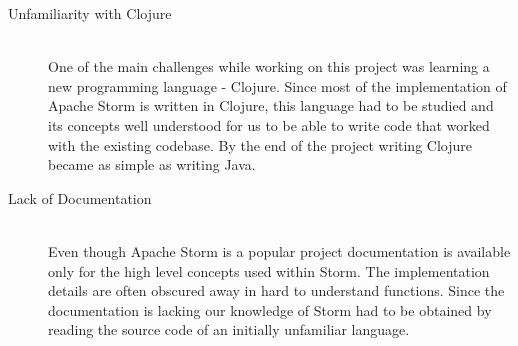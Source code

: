 \begin{description}
	\item[Unfamiliarity with Clojure] \hfill \\
	One of the main challenges while working on this project was learning a new programming language - Clojure. Since most of the implementation of Apache Storm is written in Clojure, this language had to be studied and its concepts well understood for us to be able to write code that worked with the existing codebase. By the end of the project writing Clojure became as simple as writing Java.
	\item[Lack of Documentation] \hfill \\
	Even though Apache Storm is a popular project documentation is available only for the high level concepts used within Storm. The implementation details are often obscured away in hard to understand functions. Since the documentation is lacking our knowledge of Storm had to be obtained by reading the source code of an initially unfamiliar language.
\end{description}

